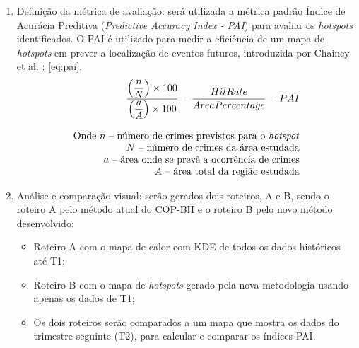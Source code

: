 \begin{enumerate}
  \item{Definição da métrica de avaliação: será utilizada a métrica padrão Índice de Acurácia Preditiva (\textit{Predictive Accuracy Index - PAI}) para avaliar os \textit{hotspots} identificados. O PAI é utilizado para medir a eficiência de um mapa de \textit{hotspots} em prever a localização de eventos futuros, introduzida por Chainey et al. \cite{Chainey2008}: \ref{eq:pai}.\\  }
  \begin{equation} \label{eq:pai}
    \begin{array}{rcl}
      \dfrac{\left( \dfrac{n}{N} \right) \times 100}{\left( \dfrac{a}{A} \right) \times 100} = \dfrac{HitRate}{AreaPercentage} = PAI \\ \\
      \text{Onde } n \text{ -- número de crimes previstos para o \textit{hotspot}} \\
      N \text{ -- número de crimes da área estudada} \\
      a \text{ -- área onde se prevê a ocorrência de crimes} \\
      A \text{ -- área total da região estudada} \\
    \end{array}
  \end{equation}
  \item{Análise e comparação visual: serão gerados dois roteiros, A e B, sendo o roteiro A pelo método atual do COP-BH e o roteiro B pelo novo método desenvolvido:}
  \begin{itemize}
    \item{Roteiro A com o mapa de calor com KDE de todos os dados históricos até T1;}
    \item{Roteiro B com o mapa de \textit{hotspots} gerado pela nova metodologia usando apenas os dados de T1;}
    \item{Os dois roteiros serão comparados a um mapa que mostra os dados do trimestre seguinte (T2), para calcular e comparar os índices PAI.}
  \end{itemize}
\end{enumerate}

